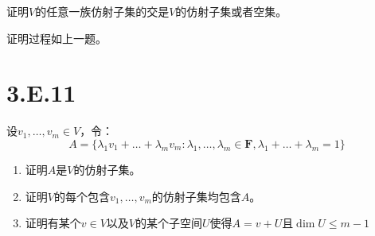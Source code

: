 \documentclass[10pt,a4paper,UTF8]{article}
\begin{document}
\begin{problem}
证明\(V\)的任意一族仿射子集的交是\(V\)的仿射子集或者空集。
\end{problem}

\begin{answer}
证明过程如上一题。
\end{answer}
\section{3.E.11}
\label{sec:orgaca6923}


\begin{problem}
设\(v_{1},\ldots ,v_{m}\in V\)，令：
\begin{equation}
\label{eq:4}
A = \{\lambda_{1}v_{1} + \ldots + \lambda_{m} v_{m}:\lambda_{1},\ldots ,\lambda_{m} \in \mathbf{F}, \lambda_{1} + \ldots + \lambda_{m} = 1\}
\end{equation}

\begin{enumerate}
\item 证明\(A\)是\(V\)的仿射子集。
\item 证明\(V\)的每个包含\(v_{1},\ldots ,v_{m}\)的仿射子集均包含\(A\)。
\item 证明有某个\(v\in V\)以及\(V\)的某个子空间\(U\)使得\(A = v+U\)且\(\dim U \leq m-1\)
\end{enumerate}
\end{problem}
\end{document}
